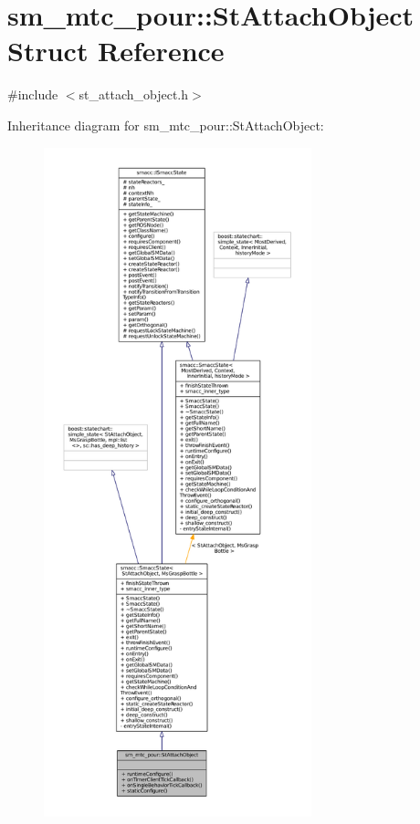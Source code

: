 \hypertarget{structsm__mtc__pour_1_1StAttachObject}{}\section{sm\+\_\+mtc\+\_\+pour\+:\+:St\+Attach\+Object Struct Reference}
\label{structsm__mtc__pour_1_1StAttachObject}


{\ttfamily \#include $<$st\+\_\+attach\+\_\+object.\+h$>$}



Inheritance diagram for sm\+\_\+mtc\+\_\+pour\+:\+:St\+Attach\+Object\+:
\nopagebreak
\begin{figure}[H]
\begin{center}
\leavevmode
\includegraphics[height=550pt]{structsm__mtc__pour_1_1StAttachObject__inherit__graph}
\end{center}
\end{figure}


